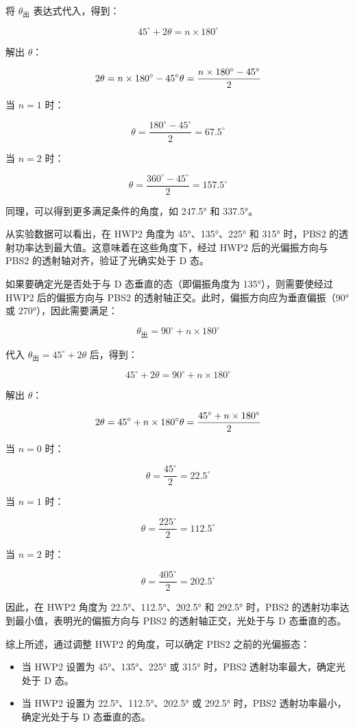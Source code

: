 \begin{enumerate}
\begin{itemize}
		将 \(\theta_{\text{出}}\) 表达式代入，得到：
		
		\[
		45^\circ + 2\theta = n \times 180^\circ
		\]
		
		解出 \(\theta\)：
		
		\[
		2\theta = n \times 180^\circ - 45^\circ \\
		\theta = \frac{n \times 180^\circ - 45^\circ}{2}
		\]
		
		当 \(n = 1\) 时：
		
		\[
		\theta = \frac{180^\circ - 45^\circ}{2} = 67.5^\circ
		\]
		
		当 \(n = 2\) 时：
		
		\[
		\theta = \frac{360^\circ - 45^\circ}{2} = 157.5^\circ
		\]
		
		同理，可以得到更多满足条件的角度，如 247.5° 和 337.5°。
		
		从实验数据可以看出，在 HWP2 角度为 45°、135°、225° 和 315° 时，PBS2 的透射功率达到最大值。这意味着在这些角度下，经过 HWP2 后的光偏振方向与 PBS2 的透射轴对齐，验证了光确实处于 D 态。
		
		如果要确定光是否处于与 D 态垂直的态（即偏振角度为 135°），则需要使经过 HWP2 后的偏振方向与 PBS2 的透射轴正交。此时，偏振方向应为垂直偏振（90° 或 270°），因此需要满足：
		
		\[
		\theta_{\text{出}} = 90^\circ + n \times 180^\circ
		\]
		
		代入 \(\theta_{\text{出}} = 45^\circ + 2\theta\) 后，得到：
		
		\[
		45^\circ + 2\theta = 90^\circ + n \times 180^\circ
		\]
		
		解出 \(\theta\)：
		
		\[
		2\theta = 45^\circ + n \times 180^\circ \\
		\theta = \frac{45^\circ + n \times 180^\circ}{2}
		\]
		
		当 \(n = 0\) 时：
		
		\[
		\theta = \frac{45^\circ}{2} = 22.5^\circ
		\]
		
		当 \(n = 1\) 时：
		
		\[
		\theta = \frac{225^\circ}{2} = 112.5^\circ
		\]
		
		当 \(n = 2\) 时：
		
		\[
		\theta = \frac{405^\circ}{2} = 202.5^\circ
		\]
		
		因此，在 HWP2 角度为 22.5°、112.5°、202.5° 和 292.5° 时，PBS2 的透射功率达到最小值，表明光的偏振方向与 PBS2 的透射轴正交，光处于与 D 态垂直的态。
		
		综上所述，通过调整 HWP2 的角度，可以确定 PBS2 之前的光偏振态：
		\begin{itemize}
			\item 当 HWP2 设置为 45°、135°、225° 或 315° 时，PBS2 透射功率最大，确定光处于 D 态。
			\item 当 HWP2 设置为 22.5°、112.5°、202.5° 或 292.5° 时，PBS2 透射功率最小，确定光处于与 D 态垂直的态。
		\end{itemize}
	\end{itemize}
	

\end{enumerate}

